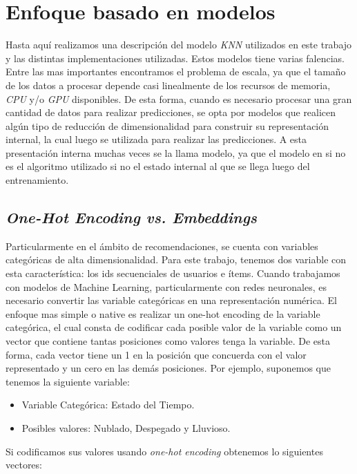 \documentclass[11pt,a4paper,twoside]{thesis}
\begin{document}
\section{Enfoque basado en modelos}

Hasta aquí realizamos una descripción del modelo \textit{KNN} utilizados en
este trabajo y las distintas implementaciones utilizadas. Estos modelos tiene
varias falencias. Entre las mas importantes encontramos el problema de escala,
ya que el tamaño de los datos a procesar depende casi linealmente de los
recursos de memoria, \textit{CPU} y/o \textit{GPU} disponibles. De esta forma,
cuando es necesario procesar una gran cantidad de datos para realizar
predicciones, se opta por modelos que realicen algún tipo de reducción de
dimensionalidad para construir su representación internal, la cual luego se
utilizada para realizar las predicciones. A esta presentación interna muchas
veces se la llama modelo, ya que el modelo en si no es el algoritmo utilizado
si no el estado internal al que se llega luego del entrenamiento.

\subsection{\textit{One-Hot Encoding vs. Embeddings}}

Particularmente en el ámbito de recomendaciones, se cuenta con variables
categóricas de alta dimensionalidad. Para este trabajo, tenemos dos variable
con esta característica: los ids secuenciales de usuarios e ítems. Cuando
trabajamos con modelos de Machine Learning, particularmente con redes
neuronales, es necesario convertir las variable categóricas en una
representación numérica. El enfoque mas simple o native es realizar un one-hot
encoding de la variable categórica, el cual consta de codificar cada posible
valor de la variable como un vector que contiene tantas posiciones como valores
tenga la variable. De esta forma, cada vector tiene un 1 en la posición que
concuerda con el valor representado y un cero en las demás posiciones. Por
ejemplo, suponemos que tenemos la siguiente variable:

\begin{itemize}
	\item Variable Categórica: Estado del Tiempo.
	\item Posibles valores: Nublado, Despegado y Lluvioso.
\end{itemize}

Si codificamos sus valores usando \textit{one-hot encoding} obtenemos lo
siguientes vectores:
\end{document}

